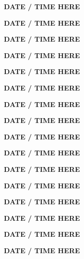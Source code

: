 \documentclass[12pt]{extbook}
\newcommand{\abstract}[2]{{
\begin{center}
\bfseries #1
\end{center}}
\par
}
\begin{document}
\clearpage

\abstract{DATE / TIME HERE}{abstracts/Blanc}
\abstract{DATE / TIME HERE}{abstracts/Brennwald}
\abstract{DATE / TIME HERE}{abstracts/Currle}
\abstract{DATE / TIME HERE}{abstracts/Daskalopoulou}
\abstract{DATE / TIME HERE}{abstracts/Dutoit}
\abstract{DATE / TIME HERE}{abstracts/Engelhardt}
\abstract{DATE / TIME HERE}{abstracts/GroegerTrampe}
\abstract{DATE / TIME HERE}{abstracts/Iwe}
\abstract{DATE / TIME HERE}{abstracts/Kimani}
\abstract{DATE / TIME HERE}{abstracts/Lightfoot}
\abstract{DATE / TIME HERE}{abstracts/Mtili}
\abstract{DATE / TIME HERE}{abstracts/Picard}
\abstract{DATE / TIME HERE}{abstracts/Roques}
\abstract{DATE / TIME HERE}{abstracts/Strauch_Zimmer}
\abstract{DATE / TIME HERE}{abstracts/vanRooyen}
\abstract{DATE / TIME HERE}{abstracts/Wang}
\end{document}
